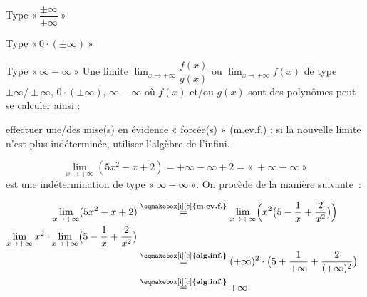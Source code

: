 \documentclass[a4paper,12pt]{article}
\begin{document}
\begin{methode}
	Type $«~\dfrac{\pm\infty}{\pm\infty}~»$
	\vspace{0.3cm}

	Type $«~0\cdot(\pm\infty)~»$
	
	\vspace{0.3cm}
	Type $«~\infty-\infty~»$
	\tcblower
Une limite \(\displaystyle\lim_{x\to\pm\infty}\dfrac{f(x)}{g(x)}\) ou \(\displaystyle\lim_{x\to\pm\infty}f(x)\) de type \(\pm\infty/\pm\infty\), \(0\cdot(\pm\infty)\), \(\infty-\infty\) où \(f(x)\) et/ou \(g(x)\) sont des polynômes peut se calculer ainsi :
	\begin{tasks}	
\task effectuer une/des mise(s) en évidence « forcée(s) » (m.ev.f.) ;
\task si la nouvelle limite n’est plus indéterminée, utiliser l’algèbre de l’infini.
	\end{tasks}
\end{methode}

\begin{exemple}
\tcblower

\[
\lim_{x\to+\infty}(5x^2 - x + 2)
=+\infty - \infty + 2
=«~+\infty - \infty~»
\]
 est une indétermination de type $«~\infty-\infty~»$. On procède de la manière suivante~:

$
 \begin{aligned}
	 \displaystyle{\lim_{x\to+\infty}(5x^2 - x + 2)}
 &\stackrel{\text{\eqmakebox[i][c]{{\bfseries {m.ev.f.}}}}}{=}
 \displaystyle{\lim_{x\to+\infty}\Bigl(x^2\bigl(5 - \dfrac{1}{x} + \dfrac{2}{x^2}\bigr)\Bigr)}\\
\displaystyle{\lim_{x\to+\infty}x^2\cdot\lim_{x\to+\infty}\bigl(5 - \dfrac{1}{x} + \dfrac{2}{x^2}\bigr)}\\
&\stackrel{\text{\eqmakebox[i][c]{\bfseries {alg.inf.}}}}{=}
\displaystyle{(+\infty)^2\cdot\bigl(5 + \dfrac{1}{+\infty} + \dfrac{2}{(+\infty)^2}\bigr)}\\
&\stackrel{\text{\eqmakebox[i][c]{\bfseries {alg.inf.}}}}{=}
+\infty
\end{aligned}
$

\end{exemple}
\end{document}
